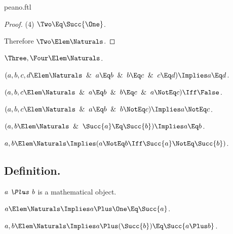 \documentclass{stex}
\begin{document}
\begin{smodule}{peano.ftl}
\begin{forthel}
\begin{proof}
    (4) $\Two \Eq \Succ{\One}$.

    Therefore $\Two \Elem \Naturals$.
  \end{proof}

  \begin{theorem*}[title=12,name=P12]
    $\Three,\Four \Elem \Naturals$.
  \end{theorem*}

  \begin{theorem*}[title=13,name=P13]
    $(a,b,c,d \Elem \Naturals \And a \Eq b \And b \Eq c \And c \Eq d) \Implies a \Eq d$.
  \end{theorem*}

  \begin{theorem*}[title=14,name=P14]
    $(a,b,c \Elem \Naturals \And a \Eq b \And b \Eq c \And a \NotEq c) \Iff \False$.
  \end{theorem*}

  \begin{theorem*}[title=15,name=P15]
    $(a,b,c \Elem \Naturals \And a \Eq b \And b \NotEq c) \Implies a \NotEq c$.
  \end{theorem*}

  \begin{theorem*}[title=16,name=P16]
    $(a,b \Elem \Naturals \And \Succ{a} \Eq \Succ{b}) \Implies a \Eq b$.
  \end{theorem*}

  \begin{theorem*}[title=17,name=P17]
    $a,b \Elem \Naturals \Implies (a \NotEq b \Iff \Succ{a} \NotEq \Succ{b})$.
  \end{theorem*}
\end{forthel}


\subsection{Definition.}


\begin{forthel}
  \begin{signature*}[for=Plus]
    $\emph{a \Plus b}$ is a mathematical object.
  \end{signature*}

  \begin{axiom*}
    $a \Elem \Naturals \Implies a \Plus \One \Eq \Succ{a}$.
  \end{axiom*}

  \begin{axiom*}[title=18,name=P18]
    $a,b \Elem \Naturals \Implies a \Plus (\Succ{b}) \Eq \Succ{a \Plus b}$.
  \end{axiom*}
\end{forthel}



\end{smodule}
\end{document}
